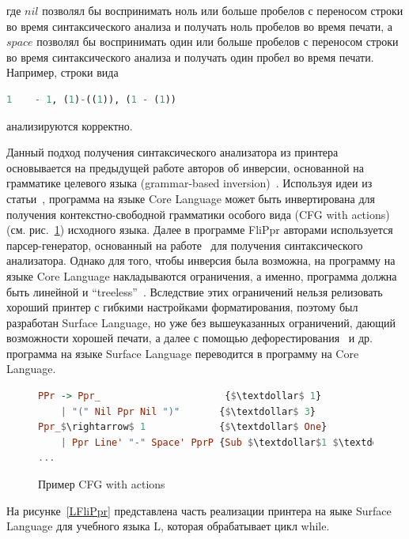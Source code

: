 \noindent где $nil$ позволял бы воспринимать ноль или больше пробелов с переносом строки во 
время синтаксического анализа и получать ноль пробелов во время печати, а  $space$ позволял 
бы воспринимать один или больше пробелов с переносом строки во время синтаксического 
анализа и получать один пробел во время печати. Например, строки вида 

\begin{lstlisting}[language=Haskell]
   1    - 1, (1)-((1)), (1 - (1))
\end{lstlisting} 

\noindent анализируются корректно.

Данный подход получения синтаксического анализатора из принтера основывается на предыдущей работе авторов
об инверсии, основанной на грамматике целевого языка
(grammar-based inversion)~\cite{MatsudaPrew}.
Используя идеи из статьи~\cite{MatsudaPrew}, 
программа на языке Core Language может быть инвертирована для получения контекстно-свободной 
грамматики особого вида (CFG with actions) (см. рис.~\ref{CFGAct}) исходного языка. 
Далее в программе FliPpr авторами используется парсер-генератор, основанный на работе~\cite{Frost} 
для получения синтаксического анализатора. Однако для того, чтобы инверсия была возможна, 
на программу на языке Core Language накладываются ограничения, а именно, программа должна 
быть линейной и ``treeless''~\cite{WadlerDeforest}. Вследствие этих ограничений нельзя 
релизовать хороший принтер с гибкими настройками форматирования, поэтому был разработан 
Surface Language, но уже без вышеуказанных ограничений, дающий возможности хорошей 
печати, а далее с помощью дефорестирования~\cite{WadlerDeforest} и др. программа на языке 
Surface Language переводится в программу на Core Language.

\begin{figure}[h]
\centering
\begin{lstlisting}[language=Haskell,mathescape]
PPr -> Ppr_                      {$\textdollar$ 1}
    | "(" Nil Ppr Nil ")"       {$\textdollar$ 3} 
Ppr_$\rightarrow$ 1             {$\textdollar$ One}
    | Ppr Line' "-" Space' PprP {Sub $\textdollar$1 $\textdollar$5 }
...    
\end{lstlisting}
\caption{Пример CFG with actions}
\label{CFGAct}
\end{figure}

На рисунке~\ref{LFliPpr} представлена часть реализации принтера на яыке Surface Language для учебного 
языка L, которая обрабатывает цикл while.

